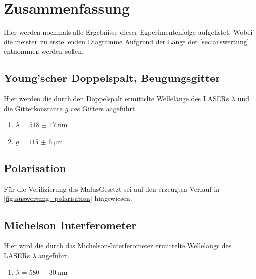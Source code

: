 \documentclass[12pt,english,ngerman]{scrartcl}
\begin{document}
\newpage

\section{Zusammenfassung}\label{sec:zusammenfassung}

Hier werden nochmals alle Ergebnisse dieser Experimentenfolge aufgelistet.
Wobei die meisten zu erstellenden Diagramme Aufgrund der Länge der
\autoref{sec:auswertung} entnommen werden sollen.

\subsection{Young'scher Doppelspalt, Beugungsgitter}

Hier werden die durch den Doppelspalt ermittelte Wellelänge des LASERs
$\lambda$ und die Gitterkonstante $g$ des Gitters angeführt.

\begin{enumerate}
	\item $\lambda = \SI{518(17)}{\nm}$
	\item $g = \SI{115(6)}{\um}$
\end{enumerate}

\subsection{Polarisation}

Für die Verifizierung des MalusGesetzt sei auf den erzeugten Verlauf in 
\autoref{fig:auswertung_polarisation} hingewiesen.

\subsection{Michelson Interferometer}
Hier wird die durch das Michelson-Interferometer ermittelte Wellelänge des LASERs
$\lambda$ angeführt.
\begin{enumerate}
	\item $\lambda = \SI{580(30)}{\nm}$
\end{enumerate}

\newpage
\printbibliography
\listoffigures
\listoftables
\end{document}
